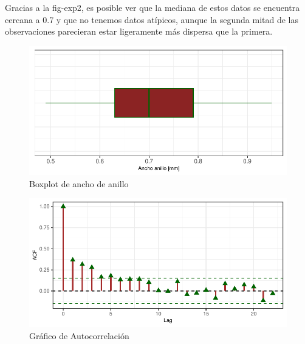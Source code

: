 \documentclass[
  letterpaper,
  DIV=11,
  numbers=noendperiod,
  twocolumn]{scrartcl}
\begin{document}
Gracias a la fig-exp2, es posible ver que la mediana de estos datos se
encuentra cercana a 0.7 y que no tenemos datos atípicos, aunque la
segunda mitad de las observaciones parecieran estar ligeramente más
dispersa que la primera.

\begin{figure}[H]

{\centering \includegraphics{CopyOfpdf_tarea2_files/figure-pdf/fig-exp2-1.pdf}

}

\caption{\label{fig-exp2}Boxplot de ancho de anillo}

\end{figure}

\begin{figure}[H]

{\centering \includegraphics{CopyOfpdf_tarea2_files/figure-pdf/fig-exp3-1.pdf}

}

\caption{\label{fig-exp3}Gráfico de Autocorrelación}

\end{figure}
\end{document}
